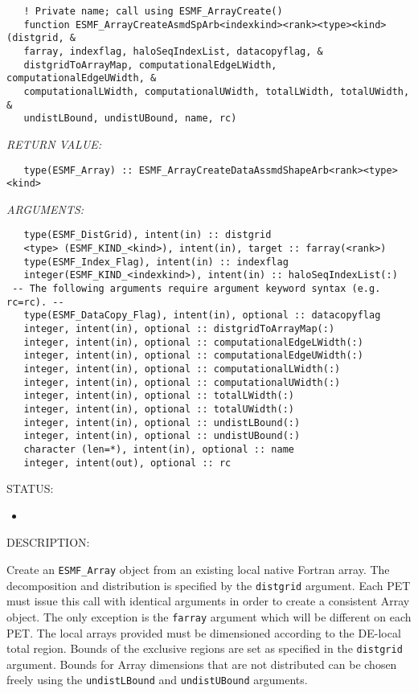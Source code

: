    
\begin{verbatim}   ! Private name; call using ESMF_ArrayCreate() 
   function ESMF_ArrayCreateAsmdSpArb<indexkind><rank><type><kind>(distgrid, & 
   farray, indexflag, haloSeqIndexList, datacopyflag, & 
   distgridToArrayMap, computationalEdgeLWidth, computationalEdgeUWidth, & 
   computationalLWidth, computationalUWidth, totalLWidth, totalUWidth, & 
   undistLBound, undistUBound, name, rc) 
   \end{verbatim}{\em RETURN VALUE:}
\begin{verbatim}   type(ESMF_Array) :: ESMF_ArrayCreateDataAssmdShapeArb<rank><type><kind> 
   \end{verbatim}{\em ARGUMENTS:}
\begin{verbatim}   type(ESMF_DistGrid), intent(in) :: distgrid 
   <type> (ESMF_KIND_<kind>), intent(in), target :: farray(<rank>) 
   type(ESMF_Index_Flag), intent(in) :: indexflag 
   integer(ESMF_KIND_<indexkind>), intent(in) :: haloSeqIndexList(:) 
 -- The following arguments require argument keyword syntax (e.g. rc=rc). --
   type(ESMF_DataCopy_Flag), intent(in), optional :: datacopyflag 
   integer, intent(in), optional :: distgridToArrayMap(:) 
   integer, intent(in), optional :: computationalEdgeLWidth(:) 
   integer, intent(in), optional :: computationalEdgeUWidth(:) 
   integer, intent(in), optional :: computationalLWidth(:) 
   integer, intent(in), optional :: computationalUWidth(:) 
   integer, intent(in), optional :: totalLWidth(:) 
   integer, intent(in), optional :: totalUWidth(:) 
   integer, intent(in), optional :: undistLBound(:) 
   integer, intent(in), optional :: undistUBound(:) 
   character (len=*), intent(in), optional :: name 
   integer, intent(out), optional :: rc 
   \end{verbatim}
{\sf STATUS:}
   \begin{itemize} 
   \item{} 
   \end{itemize} 
   
{\sf DESCRIPTION:\\ }

 
   Create an {\tt ESMF\_Array} object from an existing local native Fortran 
   array. The decomposition and distribution is 
   specified by the {\tt distgrid} argument. Each PET must issue this call 
   with identical arguments in order to create a consistent Array object. 
   The only exception is the {\tt farray} argument which will be different 
   on each PET. The local arrays provided must be dimensioned according to 
   the DE-local total region. Bounds of the exclusive regions are set as 
   specified in the {\tt distgrid} argument. Bounds for Array dimensions 
   that are not distributed can be chosen freely using the 
   {\tt undistLBound} and {\tt undistUBound} arguments. 
   
